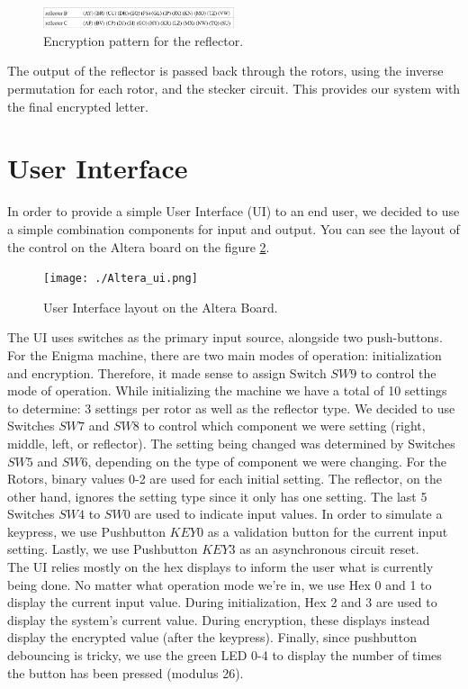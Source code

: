 \documentclass[10pt]{article}
\begin{document}
\begin{figure}[!htb]
    \centering
    \includegraphics[width=0.5\textwidth]{./reflector_encryption.png}
    \caption{Encryption pattern for the reflector.}
    \label{fig:reflector_encryption}
\end{figure}
The output of the reflector is passed back through the rotors, using the inverse permutation for each rotor, and the stecker circuit. This provides our system with the final encrypted letter.

\section{User Interface}
In order to provide a simple User Interface (UI) to an end user, we decided to use a simple combination components for input and output. You can see the layout of the control on the Altera board on the figure \ref{fig:Altera_ui}.\\
\begin{figure}[!htb]
    \centering
    \texttt{[image: ./Altera\_ui.png]}
    \caption{User Interface layout on the Altera Board.}
    \label{fig:Altera_ui}
\end{figure}
The UI uses switches as the primary input source, alongside two push-buttons. For the Enigma machine, there are two main modes of operation: initialization and encryption. Therefore, it made sense to assign Switch $SW9$ to control the mode of operation. While initializing the machine we have a total of 10 settings to determine: 3 settings per rotor as well as the reflector type. We decided to use Switches $SW7$ and $SW8$ to control which component we were setting (right, middle, left, or reflector). The setting being changed was determined by Switches $SW5$ and $SW6$, depending on the type of component we were changing. For the Rotors, binary values 0-2 are used for each initial setting. The reflector, on the other hand, ignores the setting type since it only has one setting. The last 5 Switches $SW4$ to $SW0$ are used to indicate input values. In order to simulate a keypress, we use Pushbutton $KEY0$ as a validation button for the current input setting. Lastly, we use Pushbutton $KEY3$ as an asynchronous circuit reset.\\

The UI relies mostly on the hex displays to inform the user what is currently being done. No matter what operation mode we're in, we use Hex 0 and 1 to display the current input value. During initialization, Hex 2 and 3 are used to display the system's current value. During encryption, these displays instead display the encrypted value (after the keypress). Finally, since pushbutton debouncing is tricky, we use the green LED 0-4 to display the number of times the button has been pressed (modulus 26).\\
\end{document}
